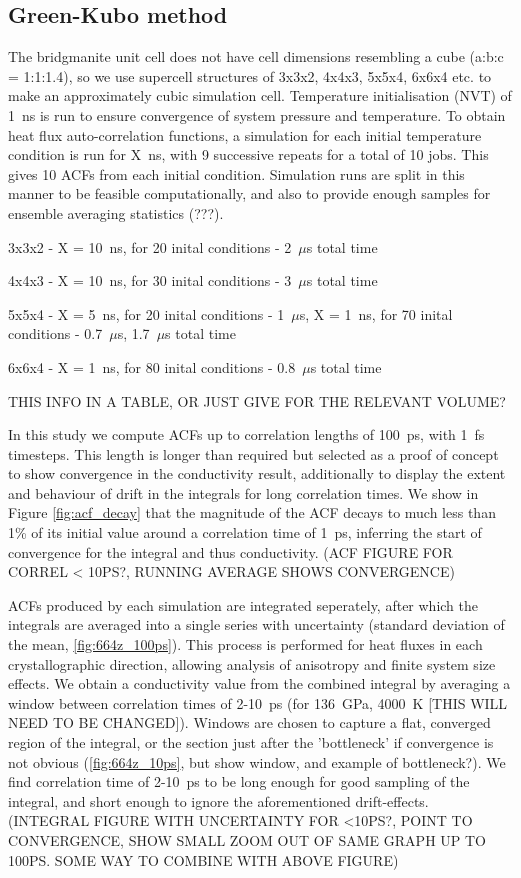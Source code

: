 \documentclass[%
preprint,                                  %
nofootinbib,
 amsmath,amssymb,
 aps,
]{revtex4-1}
\begin{document}
\subsection{\label{sec:method.gk}Green-Kubo method}

The bridgmanite unit cell does not have cell dimensions resembling a cube (a:b:c = 1:1:1.4), so we use supercell structures of 3x3x2, 4x4x3, 5x5x4, 6x6x4 etc. to make an approximately cubic simulation cell. Temperature initialisation (NVT) of 1~ns is run to ensure convergence of system pressure and temperature. To obtain heat flux auto-correlation functions, a simulation for each initial temperature condition is run for X~ns, with 9 successive repeats for a total of 10 jobs. This gives 10 ACFs from each initial condition. Simulation runs are split in this manner to be feasible computationally, and also to provide enough samples for ensemble averaging statistics (???).

3x3x2 - X = 10~ns, for 20 inital conditions - 2~$\mu$s total time

4x4x3 - X = 10~ns, for 30 inital conditions - 3~$\mu$s total time

5x5x4 - X = 5~ns, for 20 inital conditions - 1~$\mu$s, X = 1~ns, for 70 inital conditions - 0.7~$\mu$s, 1.7~$\mu$s total time

6x6x4 - X = 1~ns, for 80 inital conditions - 0.8~$\mu$s total time

THIS INFO IN A TABLE, OR JUST GIVE FOR THE RELEVANT VOLUME?

In this study we compute ACFs up to correlation lengths of 100~ps, with 1~fs timesteps. This length is longer than required but selected as a proof of concept to show convergence in the conductivity result, additionally to display the extent and behaviour of drift in the integrals for long correlation times. We show in Figure \ref{fig:acf_decay} that the magnitude of the ACF decays to much less than 1\% of its initial value around a correlation time of 1~ps, inferring the start of convergence for the integral and thus conductivity. (ACF FIGURE FOR CORREL < 10PS?, RUNNING AVERAGE SHOWS CONVERGENCE) 

ACFs produced by each simulation are integrated seperately, after which the integrals are averaged into a single series with uncertainty (standard deviation of the mean, \ref{fig:664z_100ps}). This process is performed for heat fluxes in each crystallographic direction, allowing analysis of anisotropy and finite system size effects. We obtain a conductivity value from the combined integral by averaging a window between correlation times of 2-10~ps (for 136~GPa, 4000~K [THIS WILL NEED TO BE CHANGED]). Windows are chosen to capture a flat, converged region of the integral, or the section just after the 'bottleneck' if convergence is not obvious (\ref{fig:664z_10ps}, but show window, and example of bottleneck?). We find correlation time of 2-10~ps to be long enough for good sampling of the integral, and short enough to ignore the aforementioned drift-effects. (INTEGRAL FIGURE WITH UNCERTAINTY FOR <10PS?, POINT TO CONVERGENCE, SHOW SMALL ZOOM OUT OF SAME GRAPH UP TO 100PS. SOME WAY TO COMBINE WITH ABOVE FIGURE)
\end{document}
